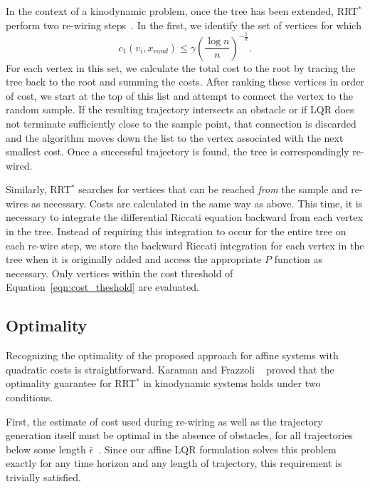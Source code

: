 \documentclass[letterpaper, 10pt, english, conference]{IEEEtran}
\begin{document}
In the context of a kinodynamic problem, once the tree has been
extended, RRT$^*$ perform two re-wiring steps~\cite{Karaman.Frazzoli:CDC10}. In
the first, we identify the set of vertices for which
\begin{equation}
c_1(v_i,x_{rand}) \leq \gamma \left( \frac{\log n}{n} \right)^{-\frac{1}{d}}.
\label{eqn:cost_theshold}
\end{equation}
For each vertex in this set, we calculate the total cost to the root
by tracing the tree back to the root and summing the costs. After
ranking these vertices in order of cost, we start at the top of this
list and attempt to connect the vertex to the random sample. If the
resulting trajectory intersects an obstacle or if LQR does not
terminate sufficiently close to the sample point, that connection is
discarded and the algorithm moves down the list to the vertex
associated with the next smallest cost. Once a successful trajectory
is found, the tree is correspondingly re-wired.

Similarly, RRT$^*$ searches for vertices that can be reached {\em
  from} the sample and re-wires as necessary. Costs are calculated in
the same way as above. This time, it is necessary to integrate the
differential Riccati equation backward from each vertex in the
tree. Instead of requiring this integration to occur for the entire
tree on each re-wire step, we store the backward Riccati integration
for each vertex in the tree when it is originally added and access the
appropriate $P$ function as necessary. Only vertices within the cost
threshold of Equation~\ref{eqn:cost_theshold} are evaluated.


\subsection{Optimality}

Recognizing the optimality of the proposed approach for affine systems
with quadratic costs
is straightforward. 
Karaman and Frazzoli ~\cite{Karaman.Frazzoli:CDC10} proved
that the optimality guarantee for RRT$^*$
in kinodynamic systems holds under two
conditions. 

First, the estimate of cost used during re-wiring as well as
the trajectory generation itself must be optimal in the absence of
obstacles, for all trajectories below some length $\bar\epsilon$~\cite{Karaman.Frazzoli:CDC10}.
Since our affine LQR formulation solves this problem exactly for any time horizon
and any length of trajectory, this requirement is trivially satisfied. 
\end{document}
